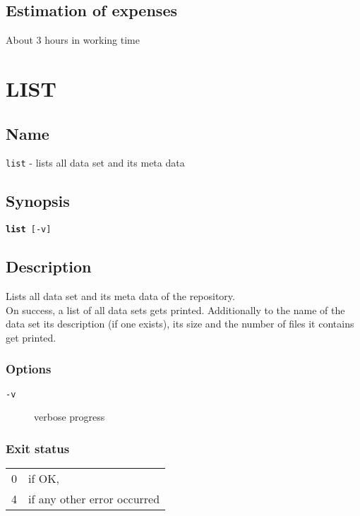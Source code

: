 \documentclass{article} %
\begin{document}
		\subsection{Estimation of expenses}
		About 3 hours in working time
		\newpage
		\section*{LIST}
		\subsection*{Name}
		\texttt{list} - lists all data set and its meta data
		\subsection*{Synopsis}
		\texttt{\textbf{list} [-v]}
		\subsection*{Description}
		Lists all data set and its meta data of the repository.\\
		
		\noindent On success, a list of all data sets gets printed. Additionally to the name of the data set its description (if one exists), its size and the number of files it contains get printed.
		\subsubsection*{Options}
		\begin{description}
			\item[\texttt{-v}] verbose progress
		\end{description}
		
		\subsubsection*{Exit status}
		\begin{tabular}{ll}
			0 &  if OK,\\ 
			4 &  if any other error occurred\\
		\end{tabular}
\end{document}
